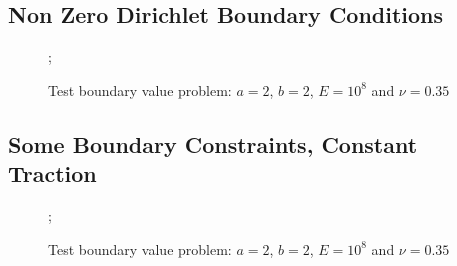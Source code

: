 \documentclass{article}
\begin{document}
\FloatBarrier
\subsection{Non Zero Dirichlet Boundary Conditions}
\FloatBarrier

\begin{figure}
    ;
    \caption{Test boundary value problem: $a = 2$, $b = 2$, $E = 10^8$ and $\nu = 0.35$}
\centering
\end{figure}

\FloatBarrier
\subsection{Some Boundary Constraints, Constant Traction}
\FloatBarrier

\begin{figure}
    ;
    \caption{Test boundary value problem: $a = 2$, $b = 2$, $E = 10^8$ and $\nu = 0.35$}
\centering
\end{figure}
\end{document}
